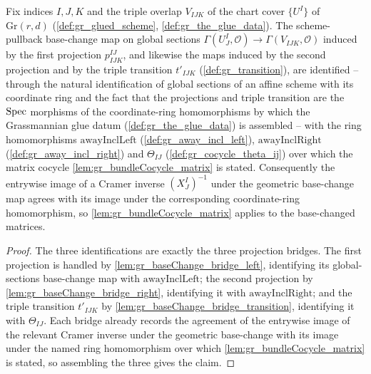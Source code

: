 \begin{lemma}\leanok
  \label{lem:gr_baseChange_bridge}
  Fix indices \(I, J, K\) and the triple overlap \(V_{IJK}\) of the chart cover
  \(\{U^I\}\) of \(\mathrm{Gr}(r,d)\) (\cref{def:gr_glued_scheme}, \cref{def:gr_the_glue_data}).
  The scheme-pullback base-change map on global sections
  \(\Gamma(U^I_J, \mathcal{O}) \to \Gamma(V_{IJK}, \mathcal{O})\) induced by the first projection
  \(p^{IJ}_{IJK}\), and likewise the maps induced by the second projection and by the triple
  transition \(t'_{IJK}\) (\cref{def:gr_transition}), are identified -- through the natural identification of global sections of an affine scheme
  with its coordinate ring and the fact that the projections and triple transition are the
  \(\operatorname{Spec}\) morphisms of the coordinate-ring homomorphisms by which the Grassmannian glue datum
  (\cref{def:gr_the_glue_data}) is assembled -- with the ring homomorphisms
  \(\mathrm{awayInclLeft}\) (\cref{def:gr_away_incl_left}),
  \(\mathrm{awayInclRight}\) (\cref{def:gr_away_incl_right}) and \(\Theta_{IJ}\)
  (\cref{def:gr_cocycle_theta_ij}) over which the matrix cocycle
  \cref{lem:gr_bundleCocycle_matrix} is stated. Consequently the entrywise image of a Cramer
  inverse \((X^I_J)^{-1}\) under the geometric base-change map agrees with its image under the
  corresponding coordinate-ring homomorphism, so \cref{lem:gr_bundleCocycle_matrix} applies
  to the base-changed matrices.
\end{lemma}
\begin{proof}
  The three identifications are exactly the three projection bridges. The first projection is
  handled by \cref{lem:gr_baseChange_bridge_left}, identifying its global-sections base-change
  map with \(\mathrm{awayInclLeft}\); the second projection by
  \cref{lem:gr_baseChange_bridge_right}, identifying it with \(\mathrm{awayInclRight}\); and the
  triple transition \(t'_{IJK}\) by \cref{lem:gr_baseChange_bridge_transition}, identifying it
  with \(\Theta_{IJ}\). Each bridge already records the agreement of the entrywise image of the
  relevant Cramer inverse under the geometric base-change with its image under the named ring
  homomorphism over which \cref{lem:gr_bundleCocycle_matrix} is stated, so assembling the three
  gives the claim.
\end{proof}

